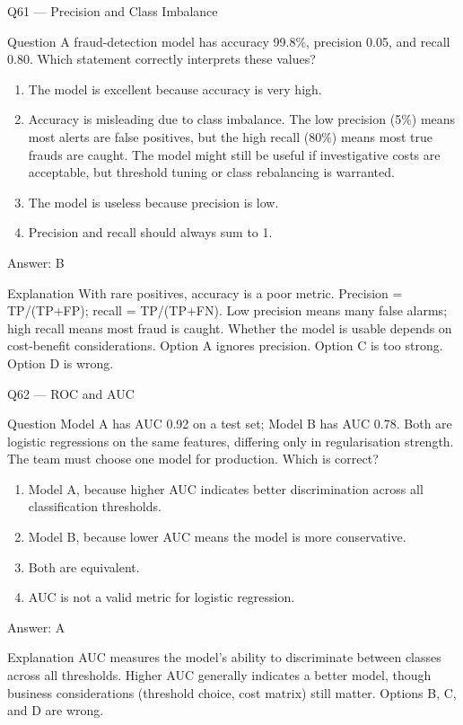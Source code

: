 \documentclass[aspectratio=169,8pt]{beamer}
\begin{document}
	\begin{frame}{Q61 --- Precision and Class Imbalance}
		\begin{block}{Question}
			A fraud-detection model has accuracy 99.8\%, precision 0.05, and recall 0.80. Which statement correctly interprets these values?
		\end{block}
		\begin{enumerate}
			\item The model is excellent because accuracy is very high.
			\item Accuracy is misleading due to class imbalance. The low precision (5\%) means most alerts are false positives, but the high recall (80\%) means most true frauds are caught. The model might still be useful if investigative costs are acceptable, but threshold tuning or class rebalancing is warranted.
			\item The model is useless because precision is low.
			\item Precision and recall should always sum to 1.
		\end{enumerate}
		\begin{exampleblock}{Answer: B}\end{exampleblock}
		\begin{block}{Explanation}
			With rare positives, accuracy is a poor metric. Precision = TP/(TP+FP); recall = TP/(TP+FN). Low precision means many false alarms; high recall means most fraud is caught. Whether the model is usable depends on cost-benefit considerations. Option A ignores precision. Option C is too strong. Option D is wrong.
		\end{block}
	\end{frame}
	
	\begin{frame}{Q62 --- ROC and AUC}
		\begin{block}{Question}
			Model A has AUC 0.92 on a test set; Model B has AUC 0.78. Both are logistic regressions on the same features, differing only in regularisation strength. The team must choose one model for production. Which is correct?
		\end{block}
		\begin{enumerate}
			\item Model A, because higher AUC indicates better discrimination across all classification thresholds.
			\item Model B, because lower AUC means the model is more conservative.
			\item Both are equivalent.
			\item AUC is not a valid metric for logistic regression.
		\end{enumerate}
		\begin{exampleblock}{Answer: A}\end{exampleblock}
		\begin{block}{Explanation}
			AUC measures the model's ability to discriminate between classes across all thresholds. Higher AUC generally indicates a better model, though business considerations (threshold choice, cost matrix) still matter. Options B, C, and D are wrong.
		\end{block}
	\end{frame}
	
\end{document}
